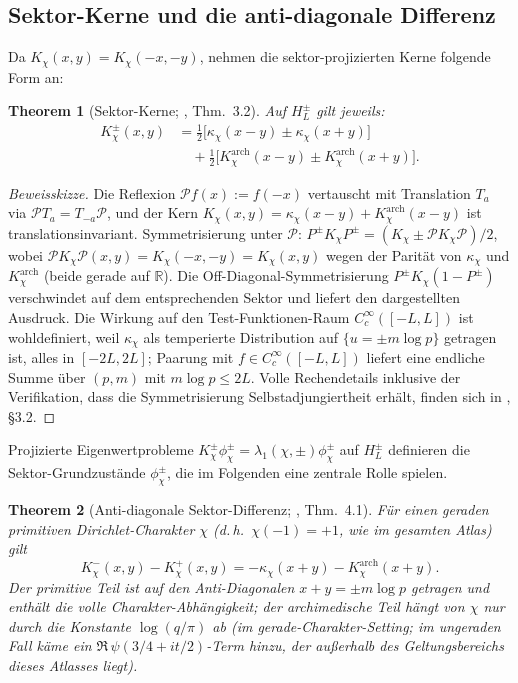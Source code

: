 \documentclass[a4paper,10pt,twocolumn]{article}
\newtheorem{theorem}{Theorem}[section]
\theoremstyle{definition}
\theoremstyle{remark}
\newcommand{\chifn}{\chi}
\begin{document}
\subsection{Sektor-Kerne und die anti-diagonale Differenz}

Da $K_{\chifn}(x,y)=K_{\chifn}(-x,-y)$, nehmen die sektor-projizierten
Kerne folgende Form an:
\begin{theorem}[Sektor-Kerne; {\cite{AnalyticKernel}, Thm.~3.2}]
\label{thm:kernel}
Auf $H_L^\pm$ gilt jeweils:
\[
\begin{aligned}
  K_{\chifn}^{\pm}(x,y)
    &=\tfrac{1}{2}\bigl[\kappa_{\chifn}(x-y)
       \pm\kappa_{\chifn}(x+y)\bigr]\\
    &\quad+\tfrac{1}{2}\bigl[K^{\mathrm{arch}}_{\chifn}(x-y)
       \pm K^{\mathrm{arch}}_{\chifn}(x+y)\bigr].
\end{aligned}
\]
\end{theorem}

\begin{proof}[Beweisskizze]
Die Reflexion $\mathcal{P}f(x):=f(-x)$ vertauscht mit Translation
$T_a$ via $\mathcal{P}T_a=T_{-a}\mathcal{P}$, und der Kern
$K_\chi(x,y)=\kappa_\chi(x-y)+K^{\mathrm{arch}}_\chi(x-y)$ ist
translationsinvariant. Symmetrisierung unter $\mathcal{P}$:
$P^\pm K_\chi P^\pm = (K_\chi \pm \mathcal{P}K_\chi\mathcal{P})/2$,
wobei $\mathcal{P}K_\chi\mathcal{P}(x,y)=K_\chi(-x,-y)=K_\chi(x,y)$
wegen der Parität von $\kappa_\chi$ und $K^{\mathrm{arch}}_\chi$
(beide gerade auf $\mathbb{R}$). Die Off-Diagonal-Symmetrisierung
$P^\pm K_\chi (1-P^\pm)$ verschwindet auf dem entsprechenden Sektor
und liefert den dargestellten Ausdruck. Die Wirkung auf den
Test-Funktionen-Raum $C_c^\infty([-L,L])$ ist wohldefiniert, weil
$\kappa_\chi$ als temperierte Distribution auf $\{u=\pm m\log p\}$
getragen ist, alles in $[-2L,2L]$; Paarung mit $f\in C_c^\infty([-L,L])$
liefert eine endliche Summe über $(p,m)$ mit $m\log p\leq 2L$. Volle
Rechendetails inklusive der Verifikation, dass die Symmetrisierung
Selbstadjungiertheit erhält, finden sich in \cite{AnalyticKernel},
\S3.2.
\end{proof}

Projizierte Eigenwertprobleme
$K_{\chifn}^{\pm}\phi_{\chifn}^{\pm}=\lambda_1(\chifn,\pm)\phi_{\chifn}^{\pm}$
auf $H_L^\pm$ definieren die Sektor-Grundzustände $\phi_{\chifn}^\pm$,
die im Folgenden eine zentrale Rolle spielen.

\begin{theorem}[Anti-diagonale Sektor-Differenz; {\cite{AnalyticKernel}, Thm.~4.1}]
\label{thm:sector-diff}
Für einen geraden primitiven Dirichlet-Charakter $\chifn$ (d.\,h.\
$\chifn(-1)=+1$, wie im gesamten Atlas) gilt
\[
  K_{\chifn}^-(x,y)-K_{\chifn}^+(x,y)
    =-\kappa_{\chifn}(x+y)-K^{\mathrm{arch}}_{\chifn}(x+y).
\]
Der primitive Teil ist auf den Anti-Diagonalen $x+y=\pm m\log p$ getragen
und enthält die volle Charakter-Abhängigkeit; der archimedische Teil
hängt von $\chifn$ nur durch die Konstante $\log(q/\pi)$ ab (im
gerade-Charakter-Setting; im ungeraden Fall käme ein
$\Re\,\psi(3/4+it/2)$-Term hinzu, der außerhalb des Geltungsbereichs
dieses Atlasses liegt).
\end{theorem}
\end{document}
